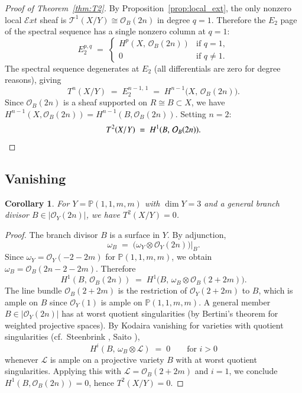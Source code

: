 \documentclass[11pt,twoside]{amsart}
\theoremstyle{plain}
\numberwithin{equation}{section}
\newtheorem{corollary}[theorem]{Corollary}
\newcommand{\OO}{\mathcal{O}}
\newcommand{\PP}{\mathbb{P}}
\theoremstyle{definition}
\newcommand{\cT}{\mathcal{T}}
\begin{document}
\begin{proof}[Proof of Theorem~\ref{thm:T2}]
By Proposition~\ref{prop:local_ext}, the only nonzero local $\mathcal{E}xt$ sheaf is $\cT^1(X/Y) \cong \OO_B(2n)$ in degree $q = 1$. Therefore the $E_2$ page of the spectral sequence has a single nonzero column at $q = 1$:
\[
E_2^{p,q} \;=\;
\begin{cases}
H^p(X,\, \OO_B(2n)) & \text{if } q = 1, \\
0 & \text{if } q \neq 1.
\end{cases}
\]
The spectral sequence degenerates at $E_2$ (all differentials are zero for degree reasons), giving
\[
T^n(X/Y) \;=\; E_2^{n-1,\, 1} \;=\; H^{n-1}\!\big(X,\, \OO_B(2n)\big).
\]
Since $\OO_B(2n)$ is a sheaf supported on $R \cong B \subset X$, we have $H^{n-1}(X, \OO_B(2n)) = H^{n-1}(B, \OO_B(2n))$. Setting $n = 2$:
\[
T^2(X/Y) \;=\; H^1(B,\, \OO_B(2n)). \qedhere
\]
\end{proof}
 
\subsection{Vanishing}
 
\begin{corollary}\label{cor:vanishing}
For $Y = \PP(1,1,m,m)$ with $\dim Y = 3$ and a general branch divisor $B \in |\OO_Y(2n)|$, we have $T^2(X/Y) = 0$.
\end{corollary}
 
\begin{proof}
The branch divisor $B$ is a surface in $Y$. By adjunction,
\[
\omega_B \;=\; \big(\omega_Y \otimes \OO_Y(2n)\big)\big|_B.
\]
Since $\omega_Y = \OO_Y(-2 - 2m)$ for $\PP(1,1,m,m)$, we obtain $\omega_B = \OO_B(2n - 2 - 2m)$. Therefore
\[
H^1(B,\, \OO_B(2n)) \;=\; H^1\!\big(B,\, \omega_B \otimes \OO_B(2 + 2m)\big).
\]
The line bundle $\OO_B(2 + 2m)$ is the restriction of $\OO_Y(2+2m)$ to $B$, which is ample on $B$ since $\OO_Y(1)$ is ample on $\PP(1,1,m,m)$. A general member $B \in |\OO_Y(2n)|$ has at worst quotient singularities (by Bertini's theorem for weighted projective spaces). By Kodaira vanishing for varieties with quotient singularities (cf.\ Steenbrink \cite{Steenbrink}, Saito \cite{Saito}),
\[
H^i(B,\, \omega_B \otimes \mathcal{L}) \;=\; 0 \qquad \text{for } i > 0
\]
whenever $\mathcal{L}$ is ample on a projective variety $B$ with at worst quotient singularities. Applying this with $\mathcal{L} = \OO_B(2+2m)$ and $i = 1$, we conclude $H^1(B, \OO_B(2n)) = 0$, hence $T^2(X/Y) = 0$.
\end{proof}
 
\end{document}
